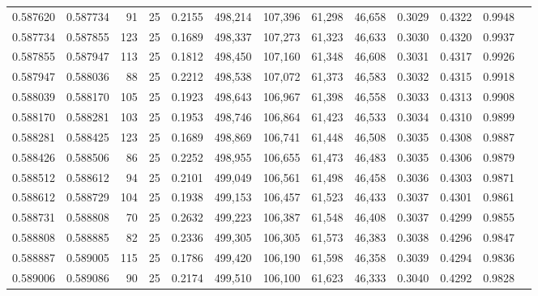\begin{tabular}{rrrrrrrrrrrrr}
0.587620 & 0.587734 &    91 &  25 &                                     0.2155 & 498,214 & 107,396 &  61,298 &  46,658 & 0.3029 & 0.4322 & 0.9948 \\
0.587734 & 0.587855 &   123 &  25 &                                     0.1689 & 498,337 & 107,273 &  61,323 &  46,633 & 0.3030 & 0.4320 & 0.9937 \\
0.587855 & 0.587947 &   113 &  25 &                                     0.1812 & 498,450 & 107,160 &  61,348 &  46,608 & 0.3031 & 0.4317 & 0.9926 \\
0.587947 & 0.588036 &    88 &  25 &                                     0.2212 & 498,538 & 107,072 &  61,373 &  46,583 & 0.3032 & 0.4315 & 0.9918 \\
0.588039 & 0.588170 &   105 &  25 &                                     0.1923 & 498,643 & 106,967 &  61,398 &  46,558 & 0.3033 & 0.4313 & 0.9908 \\
0.588170 & 0.588281 &   103 &  25 &                                     0.1953 & 498,746 & 106,864 &  61,423 &  46,533 & 0.3034 & 0.4310 & 0.9899 \\
0.588281 & 0.588425 &   123 &  25 &                                     0.1689 & 498,869 & 106,741 &  61,448 &  46,508 & 0.3035 & 0.4308 & 0.9887 \\
0.588426 & 0.588506 &    86 &  25 &                                     0.2252 & 498,955 & 106,655 &  61,473 &  46,483 & 0.3035 & 0.4306 & 0.9879 \\
0.588512 & 0.588612 &    94 &  25 &                                     0.2101 & 499,049 & 106,561 &  61,498 &  46,458 & 0.3036 & 0.4303 & 0.9871 \\
0.588612 & 0.588729 &   104 &  25 &                                     0.1938 & 499,153 & 106,457 &  61,523 &  46,433 & 0.3037 & 0.4301 & 0.9861 \\
0.588731 & 0.588808 &    70 &  25 &                                     0.2632 & 499,223 & 106,387 &  61,548 &  46,408 & 0.3037 & 0.4299 & 0.9855 \\
0.588808 & 0.588885 &    82 &  25 &                                     0.2336 & 499,305 & 106,305 &  61,573 &  46,383 & 0.3038 & 0.4296 & 0.9847 \\
0.588887 & 0.589005 &   115 &  25 &                                     0.1786 & 499,420 & 106,190 &  61,598 &  46,358 & 0.3039 & 0.4294 & 0.9836 \\
0.589006 & 0.589086 &    90 &  25 &                                     0.2174 & 499,510 & 106,100 &  61,623 &  46,333 & 0.3040 & 0.4292 & 0.9828 \\

\end{tabular}
